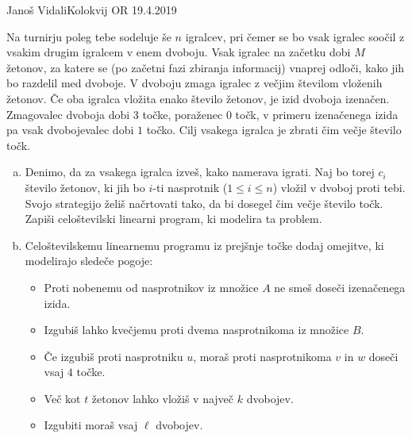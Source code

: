 \begin{naloga}{Janoš Vidali}{Kolokvij OR 19.4.2019}
\begin{vprasanje}
Na turnirju poleg tebe sodeluje še $n$ igralcev,
pri čemer se bo vsak igralec soočil z vsakim drugim igralcem v enem dvoboju.
Vsak igralec na začetku dobi $M$ žetonov,
za katere se (po začetni fazi zbiranja informacij) vnaprej odloči,
kako jih bo razdelil med dvoboje.
V dvoboju zmaga igralec z večjim številom vloženih žetonov.
Če oba igralca vložita enako število žetonov, je izid dvoboja izenačen.
Zmagovalec dvoboja dobi $3$ točke, poraženec $0$ točk,
v primeru izenačenega izida pa vsak dvobojevalec dobi $1$ točko.
Cilj vsakega igralca je zbrati čim večje število točk.

\begin{enumerate}[(a)]
\item Denimo, da za vsakega igralca izveš, kako namerava igrati.
Naj bo torej $c_i$ število žetonov,
ki jih bo $i$-ti nasprotnik ($1 \le i \le n$) vložil v dvoboj proti tebi.
Svojo strategijo želiš načrtovati tako, da bi dosegel čim večje število točk.
Zapiši celoštevilski linearni program, ki modelira ta problem.

\item Celoštevilskemu linearnemu programu iz prejšnje točke dodaj omejitve,
ki modelirajo sledeče pogoje:
    \begin{itemize}
    \item Proti nobenemu od nasprotnikov iz množice $A$
    ne smeš doseči izenačenega izida.
    \item Izgubiš lahko kvečjemu proti dvema nasprotnikoma iz množice $B$.
    \item Če izgubiš proti nasprotniku $u$,
    moraš proti nasprotnikoma $v$ in $w$ doseči vsaj $4$ točke.
    \item Več kot $t$ žetonov lahko vložiš v največ $k$ dvobojev.
    \item Izgubiti moraš vsaj $\ell$ dvobojev.
    \end{itemize}
\end{enumerate}
\end{vprasanje}


\end{naloga}
